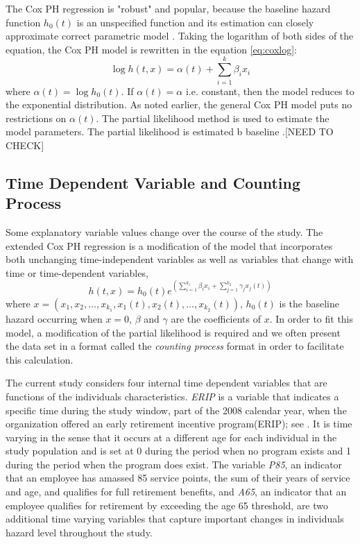 \documentclass[12pt,letterpaper]{article}
\begin{document}
The Cox PH regression is "robust" and popular, because the baseline hazard function $h_0 (t)$ is an unspecified function and its estimation can closely approximate correct parametric model \citep{kleinbaum1998}. Taking the logarithm of both sides of the equation, the Cox PH model is rewritten in the equation \ref{eq:coxlog}:
\begin{equation}
	\label{eq:coxlog}
	\log{h(t,x)}=\alpha(t)+\sum_{i=1}^{k}\beta_ix_i
\end{equation}
where $\alpha(t)=\log{h_0(t)}$. If $\alpha(t)=\alpha$ i.e. constant, then the model reduces to the exponential distribution. As noted earlier, the general Cox PH model puts no restrictions on $\alpha(t)$.  The partial likelihood method is used to estimate the model parameters. The partial likelihood is estimated b baseline \citep{allison1995}.[NEED TO CHECK]



\subsection{Time Dependent Variable and Counting Process}
\label{sec:coxt}
Some explanatory variable values change over the course of the study. The extended Cox PH regression is a modification of the model that incorporates both unchanging time-independent variables as well as variables that change with time or time-dependent variables,
\begin{equation}
	\label{eq:timecovar}
	h(t,x)=h_0(t)e^{(\sum_{i=1}^{k_1}\beta_ix_i+\sum_{j=1}^{k_2}\gamma_jx_j(t))}
\end{equation}
where $x=(x_1, x_2, \ldots, x_{k_1}, x_1(t), x_2(t), \ldots, x_{k_2}(t))$, $h_0(t)$ is the baseline hazard occurring when $x=0$, $\beta$ and $\gamma$ are the coefficients of $x$. In order to fit this model, a modification of the partial likelihood is required and we often present the data set in a format called the {\it counting process} format in order to facilitate this calculation.

The current study considers four internal time dependent variables that are functions of the individuals characteristics. {\it ERIP} is a variable that indicates a specific time during the study window, part of the 2008 calendar year, when the organization offered an early retirement incentive program(ERIP); see \citep{ERIP}.
 It is time varying in the sense that it occurs at a different age for each individual in the study population and is set at 0 during the period when no program exists and 1 during the period when the program does exist. The variable {\it P85}, an indicator that an employee has amassed 85 service points, the sum of their years of service and age, and qualifies for full retirement benefits, and {\it A65}, an indicator that an employee qualifies for retirement by exceeding the age 65 threshold, are two additional time varying variables that capture important changes in individuals hazard level throughout the study.
\end{document}
